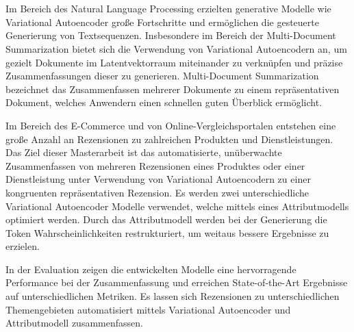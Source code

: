 \section*{}
Im Bereich des Natural Language Processing erzielten generative Modelle wie Variational Autoencoder große Fortschritte und ermöglichen die gesteuerte Generierung von Textsequenzen.
Insbesondere im Bereich der Multi-Document Summarization bietet sich die Verwendung von Variational Autoencodern an, um gezielt Dokumente im Latentvektorraum miteinander zu verknüpfen und präzise Zusammenfassungen dieser zu generieren.
Multi-Document Summarization bezeichnet das Zusammenfassen mehrerer Dokumente zu einem repräsentativen Dokument, welches Anwendern einen schnellen guten Überblick ermöglicht.

Im Bereich des E-Commerce und von Online-Vergleichsportalen entstehen eine große Anzahl an Rezensionen zu zahlreichen Produkten und Dienstleistungen.
Das Ziel dieser Masterarbeit ist das automatisierte, unüberwachte Zusammenfassen von mehreren Rezensionen eines Produktes oder einer Dienstleistung unter Verwendung von Variational Autoencodern zu einer kongruenten repräsentativen Rezension.
Es werden zwei unterschiedliche Variational Autoencoder Modelle verwendet, welche mittels eines Attributmodells optimiert werden.
Durch das Attributmodell werden bei der Generierung die Token Wahrscheinlichkeiten restrukturiert, um weitaus bessere Ergebnisse zu erzielen.

In der Evaluation zeigen die entwickelten Modelle eine hervorragende Performance bei der Zusammenfassung und erreichen State-of-the-Art Ergebnisse auf unterschiedlichen Metriken.
Es lassen sich Rezensionen zu unterschiedlichen Themengebieten automatisiert mittels Variational Autoencoder und Attributmodell zusammenfassen.


